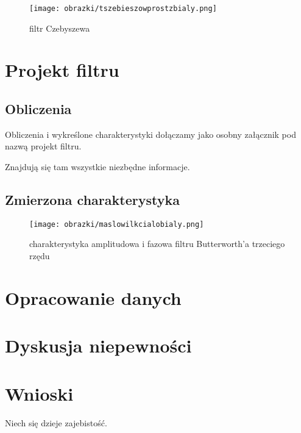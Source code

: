 \documentclass[a4paper,11pt]{article}
\begin{document}
\begin{figure}
\begin{center}
\texttt{[image: obrazki/tszebieszowprostzbialy.png]}
\end{center}
\caption{filtr Czebyszewa}
\end{figure}

\section{Projekt filtru}
\subsection{Obliczenia}
Obliczenia i wykreślone charakterystyki dołączamy jako osobny załącznik pod nazwą projekt filtru.

Znajdują się tam wszystkie niezbędne informacje.
\subsection{Zmierzona charakterystyka}

\begin{figure}
\begin{center}
\texttt{[image: obrazki/maslowilkcialobialy.png]}
\end{center}
\caption{charakterystyka amplitudowa i fazowa filtru Butterworth'a trzeciego rzędu}
\end{figure}

\section{Opracowanie danych}

\section{Dyskusja niepewności}

\section{Wnioski}


Niech się dzieje zajebistość.
\end{document}
